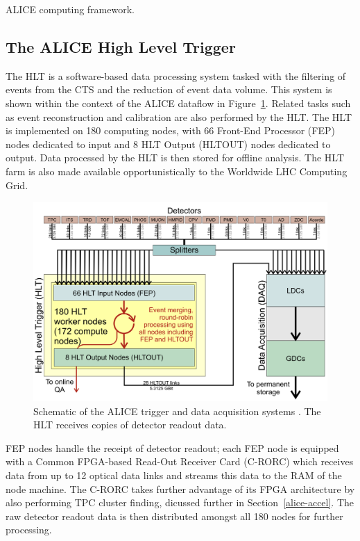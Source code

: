 ALICE computing framework. \subsection{The ALICE High Level Trigger}

The HLT is a software-based data processing system tasked with the filtering of events from the CTS and the reduction of event data volume. This system is shown within the context of the ALICE dataflow in Figure~\ref{alice-hlt-diagram}. Related tasks such as event reconstruction and calibration are also performed by the HLT. The HLT is implemented on 180 computing nodes, with 66 Front-End Processor (FEP) nodes dedicated to input and 8 HLT Output (HLTOUT) nodes dedicated to output. Data processed by the HLT is then stored for offline analysis. The HLT farm is also made available opportunistically to the Worldwide LHC Computing Grid. 

\begin{figure}[h!]
    \centering
    \includegraphics[width=0.7\linewidth]{images/alice/alice-hlt-schematic.png}
    \caption{Schematic of the ALICE trigger and data acquisition systems \cite{alice-rta-trigger}. The HLT receives copies of detector readout data.}
    \label{alice-hlt-diagram}
\end{figure}
 
FEP nodes handle the receipt of detector readout; each FEP node is equipped with a Common FPGA-based Read-Out Receiver Card (C-RORC) which receives data from up to 12 optical data links and streams this data to the RAM of the node machine. The C-RORC takes further advantage of its FPGA architecture by also performing TPC cluster finding, dicussed further in Section~\ref{alice-accel}. The raw detector readout data is then distributed amongst all 180 nodes for further processing.

